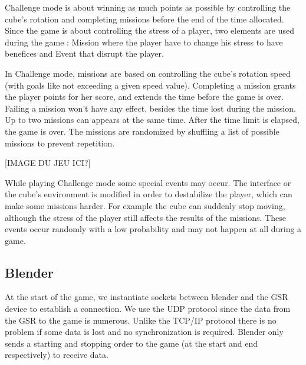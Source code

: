 \documentclass[12pt,a4paper]{article}
\begin{document}
Challenge mode is about winning as much points as possible by controlling the cube's rotation and completing missions before the end of the time allocated. Since the game is about controlling the stress of a player, two elements are used during the game : Mission where the player have to change his stress to have benefices and Event that disrupt the player.

In Challenge mode, missions are based on controlling the cube's rotation speed (with goals like not exceeding a given speed value). Completing a mission grants the player points for her score, and extends the time before the game is over. Failing a mission won't have any effect, besides the time lost during the mission. Up to two missions can appears at the same time. After the time limit is elapsed, the game is over. The missions are randomized  by shuffling a list of possible missions to prevent repetition.

[IMAGE DU JEU ICI?]

While playing Challenge mode some special events may occur. The interface or the cube's environment is modified in order to destabilize the player, which can make some missions harder. For example the cube can suddenly stop moving, although the stress of the player still affects the results of the missions. These events occur randomly with a low probability and may not happen at all during a game.

%


\subsection{Blender}

At the start of the game, we instantiate sockets between blender and the GSR device to establish a connection. We use the UDP protocol since the data from the GSR to the game is numerous. Unlike the TCP/IP protocol there is no problem if some data is lost and no synchronization is required. Blender only sends a starting and stopping order to the game (at the start and end respectively) to receive data.
\end{document}
